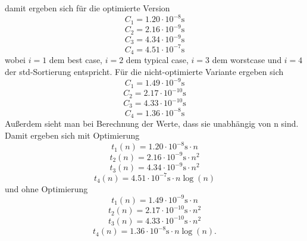 damit ergeben sich für die optimierte Version
\begin{equation}
  C_{1}=1.20\cdot 10^{-8}\mathrm{s}
\end{equation}
\begin{equation}
  C_{2}=2.16\cdot 10^{-9}\mathrm{s}
\end{equation}
\begin{equation}
  C_{3}=4.34\cdot 10^{-9}\mathrm{s}
\end{equation}
\begin{equation}
  C_{4}=4.51\cdot 10^{-7}\mathrm{s}
\end{equation}
wobei $i=1$ dem best case, $i=2$ dem typical case, $i=3$ dem worstcase und $i=4$ der std-Sortierung entspricht.
Für die nicht-optimierte Variante ergeben sich
\begin{equation}
  C_{1}=1.49\cdot 10^{-9}\mathrm{s}
\end{equation}
\begin{equation}
  C_{2}=2.17\cdot 10^{-10}\mathrm{s}
\end{equation}
\begin{equation}
  C_{3}=4.33\cdot 10^{-10}\mathrm{s}
\end{equation}
\begin{equation}
  C_{4}=1.36\cdot 10^{-8}\mathrm{s}
\end{equation}
Außerdem sieht man bei Berechnung der Werte, dass sie unabhängig von n sind. Damit ergeben sich mit Optimierung
\begin{equation}
  t_1(n)=1.20\cdot 10^{-8}\mathrm{s}\cdot n
\end{equation}
\begin{equation}
  t_2(n)=2.16\cdot 10^{-9}\mathrm{s}\cdot n^2
\end{equation}
\begin{equation}
  t_3(n)=4.34\cdot 10^{-9}\mathrm{s}\cdot n^2
\end{equation}
\begin{equation}
  t_4(n)=4.51\cdot 10^{-7}\mathrm{s}\cdot n\log(n)
\end{equation}
und ohne Optimierung
\begin{equation}
  t_1(n)=1.49\cdot 10^{-9}\mathrm{s}\cdot n
\end{equation}
\begin{equation}
  t_2(n)=2.17\cdot 10^{-10}\mathrm{s}\cdot n^2
\end{equation}
\begin{equation}
  t_3(n)=4.33\cdot 10^{-10}\mathrm{s}\cdot n^2
\end{equation}
\begin{equation}
  t_4(n)=1.36\cdot 10^{-8}\mathrm{s}\cdot n\log(n).
\end{equation}

